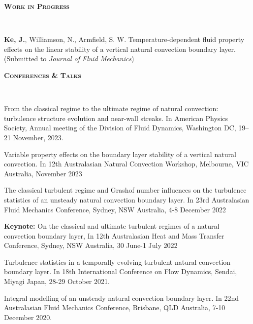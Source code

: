 \documentclass[letterpaper, 10pt]{article}
\newenvironment{changemargin}[2]{%
  \begin{list}{}{%
      \setlength{\topsep}{0pt}%
      \setlength{\leftmargin}{#1}%
      \setlength{\rightmargin}{#2}%
      \setlength{\listparindent}{\parindent}%
      \setlength{\itemindent}{\parindent}%
      \setlength{\parsep}{\parskip}%
    }%
  \item[]}{\end{list}
}
\newcommand{\lineover}{
  \begin{changemargin}{-0.05in}{-0.05in}
    \vspace*{-8pt}
    \hrulefill \\
    \vspace*{-2pt}
  \end{changemargin}
}
\newcommand{\header}[1]{
  \begin{changemargin}{-0.5in}{-0.5in}
    \textbf{\scshape{#1}}\\
    \lineover
  \end{changemargin}
}
\newenvironment{body} {
  \vspace*{-16pt}
  \begin{changemargin}{-0.25in}{-0.5in}
  }
  {\end{changemargin}
}
\begin{document}
\header{Work in Progress}
\begin{body}
  \vspace{14pt}

  \textbf{Ke, J.}, Williamson, N., Armfield, S. W. Temperature-dependent fluid property effects on the linear stability of a vertical natural convection boundary layer. (Submitted to \emph{Journal of Fluid Mechanics})
\end{body}
\smallskip

\header{Conferences \& Talks}
\begin{body}
  \vspace{14pt}
  
  From the classical regime to the ultimate regime of natural convection: turbulence structure evolution and near-wall streaks. In American Physics Society, Annual meeting of the Division of Fluid Dynamics, Washington DC, 19--21 November, 2023.
  
  \smallskip
  
  Variable property effects on the boundary layer stability of a vertical natural convection. In 12th Australasian Natural Convection Workshop, Melbourne, VIC Australia, November 2023
    
  \smallskip
  
  The classical turbulent regime and Grashof number influences on the turbulence statistics of an unsteady natural convection boundary layer. In 23rd Australasian Fluid Mechanics Conference, Sydney, NSW Australia, 4-8 December 2022
  
  \smallskip
  
  {\bf Keynote: } On the classical and ultimate turbulent regimes of a natural convection boundary layer, In 12th Australasian Heat and Mass Transfer Conference, Sydney, NSW Australia, 30 June-1 July 2022
  
  \smallskip

    Turbulence statistics in a temporally evolving turbulent natural convection boundary layer. In 18th International Conference on Flow Dynamics, Sendai, Miyagi Japan, 28-29 October 2021.

  \smallskip

  Integral modelling of an unsteady natural convection boundary layer. In 22nd Australasian Fluid Mechanics Conference, Brisbane, QLD Australia, 7-10 December 2020.
  
  \smallskip
  

\end{body}
\end{document}
